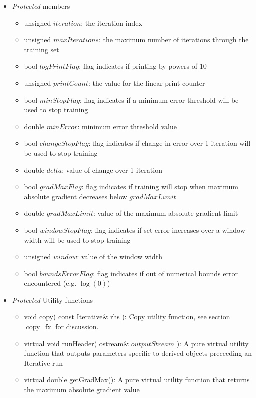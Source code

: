 \documentclass{report}
\def\beginred{\color{red}}
\def\endcolor{\color{black}}
\begin{document}
\begin{itemize}
\begin{itemize}
\end{itemize}

\item {\em Protected} members

\begin{itemize}
\item \beginred unsigned $iteration$: the iteration index \endcolor
\item unsigned $maxIterations$: the maximum number of iterations
      through the training set
\item bool $logPrintFlag$: flag indicates if printing by powers of 10
\item unsigned $printCount$: the value for the linear print counter
\item bool $minStopFlag$: flag indicates if a minimum error threshold
      will be used to stop training
\item double $minError$: minimum error threshold value
\item bool $changeStopFlag$: flag indicates if change in error over 1
      iteration will be used to stop training
\item double $delta$: value of change over 1 iteration
\item bool $gradMaxFlag$: flag indicates if training will stop when
      maximum absolute gradient decreases below $gradMaxLimit$
\item double $gradMaxLimit$: value of the maximum absolute gradient
      limit
\item bool $windowStopFlag$: flag indicates if set error increases
      over a window width will be used to stop training
\item unsigned $window$: value of the window width
\item \beginred bool $boundsErrorFlag$: flag indicates if out of
      numerical bounds error encountered (e.g. $\log(0)$) \endcolor
\end{itemize}

\item {\em Protected} Utility functions

\begin{itemize}
\item \beginred void copy( const Iterative\& rhs ): Copy utility
      function, see section \ref{copy_fx} for discussion. \endcolor
\item virtual void runHeader( ostream\& $outputStream$ ): A pure
      virtual utility function that outputs parameters specific
      to derived objects preceeding an Iterative run
\item \beginred virtual double getGradMax(): A pure virtual utility
      function that returns the maximum absolute gradient value
      \endcolor
\end{itemize}

\end{itemize}
\end{document}
